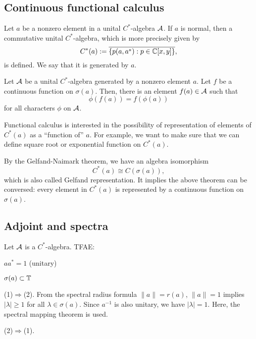 \documentclass{../crs}
\begin{document}
\subsection{Continuous functional calculus}
Let $a$ be a nonzero element in a unital $C^*$-algebra $\mathcal{A}$.
If $a$ is normal, then a commutative unital $C^*$-algebra, which is more precisely given by
\[C^*(a):=\overline{\{p(a,a^*):p\in\mathbb{C}[x,y]\}},\]
is defined.
We say that it is generated by $a$.

\begin{thm}
Let $\mathcal{A}$ be a unital $C^*$-algebra generated by a nonzero element $a$.
Let $f$ be a continuous function on $\sigma(a)$.
Then, there is an element $f(a)\in\mathcal{A}$ such that
\[\phi(f(a))=f(\phi(a))\]
for all characters $\phi$ on $\mathcal{A}$.
\end{thm}

Functional calculus is interested in the possibility of representation of elements of $C^*(a)$ as a ``function of'' $a$.
For example, we want to make sure that we can define square root or exponential function on $C^*(a)$.




By the Gelfand-Naimark theorem, we have an algebra isomorphism
\[C^*(a)\cong C(\sigma(a)),\]
which is also called Gelfand representation.
It implies the above theorem can be conversed: every element in $C^*(a)$ is represented by a continuous function on $\sigma(a)$.




\subsection{Adjoint and spectra}
\begin{thm}
Let $\mathcal{A}$ is a $C^*$-algebra.
TFAE:
\begin{cond}
\item $aa^*=1$ (unitary)
\item $\sigma(a)\subset\mathbb{T}$
\end{cond}
\end{thm}
\begin{pf}
(1)$\Rightarrow$(2).
From the spectral radius formula $\|a\|=r(a)$, $\|a\|=1$ implies $|\lambda|\ge1$ for all $\lambda\in\sigma(a)$.
Since $a^{-1}$ is also unitary, we have $|\lambda|=1$.
Here, the spectral mapping theorem is used.

(2)$\Rightarrow$(1).
\end{pf}
\end{document}
